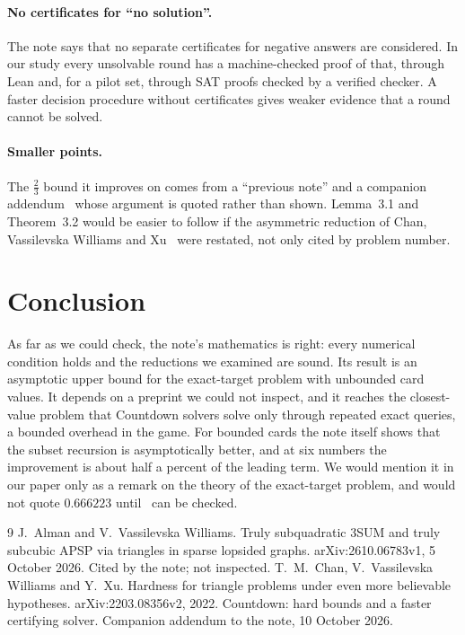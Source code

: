 \documentclass[11pt]{article}
\begin{document}
\paragraph{No certificates for ``no solution''.}
The note says that no separate certificates for negative answers are considered. In our study every
unsolvable round has a machine-checked proof of that, through Lean and, for a pilot set, through SAT
proofs checked by a verified checker. A faster decision procedure without certificates gives weaker
evidence that a round cannot be solved.

\paragraph{Smaller points.}
The $\tfrac23$ bound it improves on comes from a ``previous note'' and a companion addendum~\cite{prev}
whose argument is quoted rather than shown. Lemma~3.1 and Theorem~3.2 would be easier to follow if the
asymmetric reduction of Chan, Vassilevska Williams and Xu~\cite{cvx} were restated, not only cited by
problem number.

\section{Conclusion}

As far as we could check, the note's mathematics is right: every numerical condition holds and the
reductions we examined are sound. Its result is an asymptotic upper bound for the exact-target problem with
unbounded card values. It depends on a preprint we could not inspect, and it reaches the closest-value
problem that Countdown solvers solve only through repeated exact queries, a bounded overhead in the game. For bounded cards the note itself shows that the
subset recursion is asymptotically better, and at six numbers the improvement is about half a percent of
the leading term. We would mention it in our paper only as a remark on the theory of the exact-target
problem, and would not quote $0.666223$ until~\cite{av} can be checked.

\begin{thebibliography}{9}
 J.~Alman and V.~Vassilevska Williams. Truly subquadratic 3SUM and truly subcubic APSP via
triangles in sparse lopsided graphs. arXiv:2610.06783v1, 5 October 2026. Cited by the note; not inspected.
 T.~M.~Chan, V.~Vassilevska Williams and Y.~Xu. Hardness for triangle problems under even
more believable hypotheses. arXiv:2203.08356v2, 2022.
 Countdown: hard bounds and a faster certifying solver. Companion addendum to the note,
10 October 2026.
\end{thebibliography}
\end{document}
